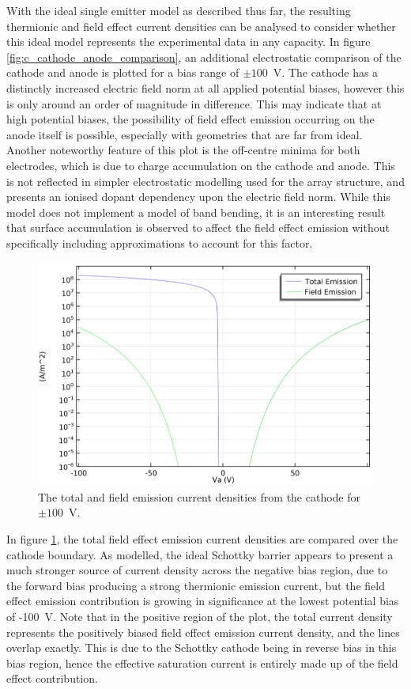 \begin{refsection}
With the ideal single emitter model as described thus far, the resulting thermionic and field effect current densities can be analysed to consider whether this ideal model represents the experimental data in any capacity. In figure \ref{fig:c_cathode_anode_comparison}, an additional electrostatic comparison of the cathode and anode is plotted for a bias range of $\pm100$~\si{\volt}. The cathode has a distinctly increased electric field norm at all applied potential biases, however this is only around an order of magnitude in difference. This may indicate that at high potential biases, the possibility of field effect emission occurring on the anode itself is possible, especially with geometries that are far from ideal. Another noteworthy feature of this plot is the off-centre minima for both electrodes, which is due to charge accumulation on the cathode and anode. This is not reflected in simpler electrostatic modelling used for the array structure, and presents an ionised dopant dependency upon the electric field norm. While this model does not implement a model of band bending, it is an interesting result that surface accumulation is observed to affect the field effect emission without specifically including approximations to account for this factor.

\begin{figure}[H]
    \centering
    \includegraphics[width=0.8\linewidth]{Chapter7/Figs/Raster/Comsol/density_thermionic_field_comparison.png}
    \caption{The total and field emission current densities from the cathode for $\pm100$~\si{\volt}.}
    \label{fig:c_density_thermionic_field_comparison}
\end{figure}

In figure \ref{fig:c_density_thermionic_field_comparison}, the total field effect emission current densities are compared over the cathode boundary. As modelled, the ideal Schottky barrier appears to present a much stronger source of current density across the negative bias region, due to the forward bias producing a strong thermionic emission current, but the field effect emission contribution is growing in significance at the lowest potential bias of -100~\si{\volt}. Note that in the positive region of the plot, the total current density represents the positively biased field effect emission current density, and the lines overlap exactly. This is due to the Schottky cathode being in reverse bias in this bias region, hence the effective saturation current is entirely made up of the field effect contribution.


\end{refsection}
